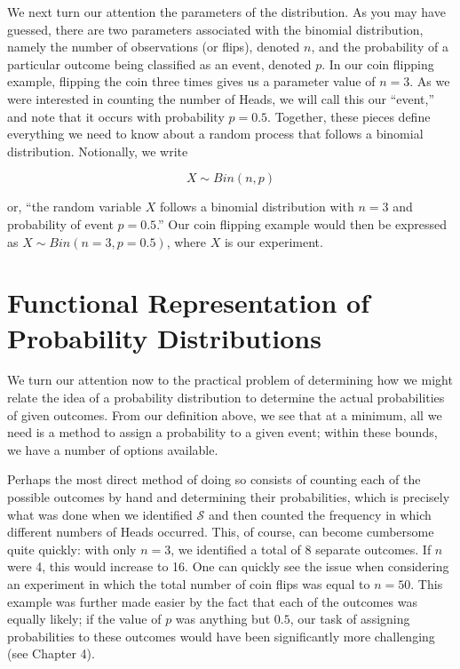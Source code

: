 \documentclass[
]{book}
\theoremstyle{definition}
\theoremstyle{definition}
\theoremstyle{definition}
\theoremstyle{remark}
\begin{document}
We next turn our attention the parameters of the distribution. As you may have guessed, there are two parameters associated with the binomial distribution, namely the number of observations (or flips), denoted \(n\), and the probability of a particular outcome being classified as an event, denoted \(p\). In our coin flipping example, flipping the coin three times gives us a parameter value of \(n = 3\). As we were interested in counting the number of Heads, we will call this our ``event,'' and note that it occurs with probability \(p = 0.5\). Together, these pieces define everything we need to know about a random process that follows a binomial distribution. Notionally, we write

\[ X \sim Bin(n, p)\]

or, ``the random variable \(X\) follows a binomial distribution with \(n = 3\) and probability of event \(p = 0.5\).'' Our coin flipping example would then be expressed as \(X \sim Bin(n = 3, p = 0.5)\), where \(X\) is our experiment.

\hypertarget{functional-representation-of-probability-distributions}{%
\section{Functional Representation of Probability Distributions}\label{functional-representation-of-probability-distributions}}

We turn our attention now to the practical problem of determining how we might relate the idea of a probability distribution to determine the actual probabilities of given outcomes. From our definition above, we see that at a minimum, all we need is a method to assign a probability to a given event; within these bounds, we have a number of options available.

Perhaps the most direct method of doing so consists of counting each of the possible outcomes by hand and determining their probabilities, which is precisely what was done when we identified \(\mathcal{S}\) and then counted the frequency in which different numbers of Heads occurred. This, of course, can become cumbersome quite quickly: with only \(n = 3\), we identified a total of 8 separate outcomes. If \(n\) were 4, this would increase to 16. One can quickly see the issue when considering an experiment in which the total number of coin flips was equal to \(n = 50\). This example was further made easier by the fact that each of the outcomes was equally likely; if the value of \(p\) was anything but \(0.5\), our task of assigning probabilities to these outcomes would have been significantly more challenging (see Chapter 4).
\end{document}
